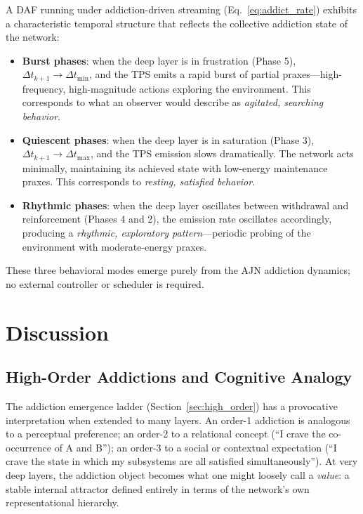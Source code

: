 \documentclass[12pt,a4paper]{article}
\begin{document}
A DAF running under addiction-driven streaming (Eq.~\eqref{eq:addict_rate})
exhibits a characteristic temporal structure that reflects the collective
addiction state of the network:

\begin{itemize}
\item \textbf{Burst phases}: when the deep layer is in frustration (Phase 5),
$\Delta t_{k+1} \to \Delta t_{\min}$, and the TPS emits a rapid burst of
partial praxes---high-frequency, high-magnitude actions exploring the environment.
This corresponds to what an observer would describe as \textit{agitated,
searching behavior}.

\item \textbf{Quiescent phases}: when the deep layer is in saturation (Phase 3),
$\Delta t_{k+1} \to \Delta t_{\max}$, and the TPS emission slows dramatically.
The network acts minimally, maintaining its achieved state with low-energy
maintenance praxes. This corresponds to \textit{resting, satisfied behavior}.

\item \textbf{Rhythmic phases}: when the deep layer oscillates between withdrawal
and reinforcement (Phases 4 and 2), the emission rate oscillates accordingly,
producing a \textit{rhythmic, exploratory pattern}---periodic probing of the
environment with moderate-energy praxes.
\end{itemize}

These three behavioral modes emerge purely from the AJN addiction dynamics; no
external controller or scheduler is required.

\section{Discussion}

\subsection{High-Order Addictions and Cognitive Analogy}

The addiction emergence ladder (Section~\ref{sec:high_order}) has a provocative
interpretation when extended to many layers. An order-1 addiction is analogous
to a perceptual preference; an order-2 to a relational concept (``I crave the
co-occurrence of A and B''); an order-3 to a social or contextual expectation
(``I crave the state in which my subsystems are all satisfied simultaneously'').
At very deep layers, the addiction object becomes what one might loosely call a
\textit{value}: a stable internal attractor defined entirely in terms of the
network's own representational hierarchy.
\end{document}
